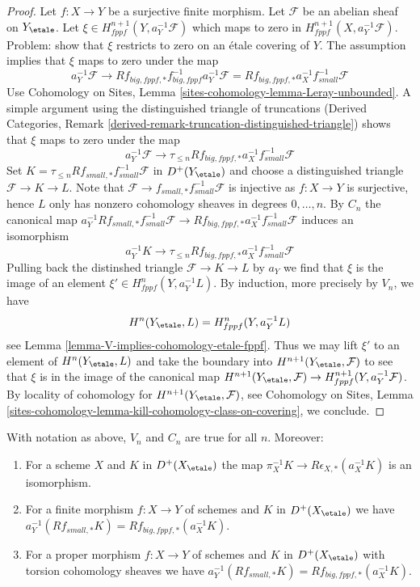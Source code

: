 \begin{proof}
\medskip\noindent
Let $f : X \to Y$ be a surjective finite morphism.
Let $\mathcal{F}$ be an abelian sheaf on $Y_\etale$.
Let $\xi \in H^{n + 1}_{fppf}(Y, a_Y^{-1}\mathcal{F})$
which maps to zero in $H^{n + 1}_{fppf}(X, a_Y^{-1}\mathcal{F})$.
Problem: show that $\xi$ restricts to zero on an \'etale covering of $Y$.
The assumption implies that $\xi$ maps to zero under the map
$$
a_Y^{-1}\mathcal{F} \longrightarrow
Rf_{big, fppf, *}f_{big, fppf}^{-1}a_Y^{-1}\mathcal{F} =
Rf_{big, fppf, *}a_X^{-1}f_{small}^{-1}\mathcal{F}
$$
Use Cohomology on Sites, Lemma \ref{sites-cohomology-lemma-Leray-unbounded}.
A simple argument using the distinguished triangle of truncations
(Derived Categories, Remark
\ref{derived-remark-truncation-distinguished-triangle}) shows that
$\xi$ maps to zero under the map
$$
a_Y^{-1}\mathcal{F} \longrightarrow
\tau_{\leq n}Rf_{big, fppf, *}a_X^{-1}f_{small}^{-1}\mathcal{F}
$$
Set $K = \tau_{\leq n}Rf_{small, *}f_{small}^{-1}\mathcal{F}$
in $D^+(Y_\etale)$ and choose a distinguished triangle
$\mathcal{F} \to K \to L$.
Note that $\mathcal{F} \to f_{small, *}f_{small}^{-1}\mathcal{F}$ is injective
as $f : X \to Y$ is surjective, hence $L$ only has nonzero
cohomology sheaves in degrees $0, \ldots, n$. By $C_n$ the canonical map
$a_Y^{-1}Rf_{small, *}f_{small}^{-1}\mathcal{F} \to
Rf_{big, fppf, *}a_X^{-1}f_{small}^{-1}\mathcal{F}$
induces an isomorphism
$$
a_Y^{-1}K \longrightarrow
\tau_{\leq n}Rf_{big, fppf, *}a_X^{-1}f_{small}^{-1}\mathcal{F}
$$
Pulling back the distinshed triangle $\mathcal{F} \to K \to L$
by $a_Y$ we find that $\xi$ is the image of an element
$\xi' \in H^n_{fppf}(Y, a_Y^{-1}L)$.
By induction, more precisely by $V_n$, we have
$$
H^n(Y_\etale, L) = H^n_{fppf}(Y, a_Y^{-1}L)
$$
see Lemma \ref{lemma-V-implies-cohomology-etale-fppf}.
Thus we may lift $\xi'$ to an element of $H^n(Y_\etale, L)$
and take the boundary into $H^{n + 1}(Y_\etale, \mathcal{F})$
to see that $\xi$ is in the image of the canonical map
$H^{n + 1}(Y_\etale, \mathcal{F}) \to
H^{n + 1}_{fppf}(Y, a_Y^{-1}\mathcal{F})$.
By locality of cohomology for $H^{n + 1}(Y_\etale, \mathcal{F})$, see
Cohomology on Sites, Lemma
\ref{sites-cohomology-lemma-kill-cohomology-class-on-covering},
we conclude.
\end{proof}

\begin{lemma}
\label{lemma-V-C-all-n-etale-fppf}
With notation as above, $V_n$ and $C_n$ are true for all $n$. Moreover:
\begin{enumerate}
\item For a scheme $X$ and $K$ in $D^+(X_\etale)$ the map
$\pi_X^{-1}K \to R\epsilon_{X, *}(a_X^{-1}K)$ is an isomorphism.
\item For a finite morphism $f : X \to Y$ of schemes
and $K$ in $D^+(X_\etale)$ we have
$a_Y^{-1}(Rf_{small, *}K) = Rf_{big, fppf, *}(a_X^{-1}K)$.
\item For a proper morphism $f : X \to Y$ of schemes
and $K$ in $D^+(X_\etale)$ with torsion cohomology sheaves we have
$a_Y^{-1}(Rf_{small, *}K) = Rf_{big, fppf, *}(a_X^{-1}K)$.
\end{enumerate}
\end{lemma}


